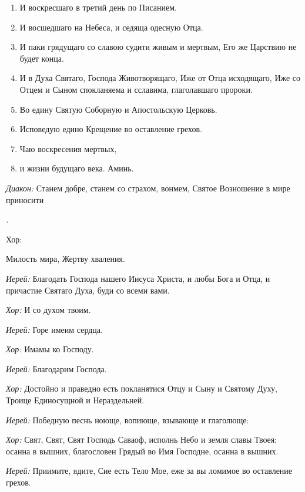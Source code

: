 \begin{mymulticols}
\begin{enumerate}
\item И воскресшаго в третий день по Писанием.


\item И восшедшаго на Небеса, и седяща одесную Отца.


\item И паки грядущаго со славою судити живым и мертвым, Его же Царствию не будет конца.


\item И в Духа Святаго, Господа Животворящаго, Иже от Отца исходящаго, Иже со Отцем и Сыном спокланяема и сславима, глаголавшаго пророки.


\item Во едину Святую Соборную и Апостольскую Церковь.


\item Исповедую едино Крещение во оставление грехов.


\item Чаю воскресения мертвых,


\item и жизни будущаго века. Аминь. 

\end{enumerate}




 {\itshape Диакон:} Станем добре, станем со страхом, вонмем, Святое Возношение в мире приносити{\itshape . 


  Хор:} Милость мира, Жертву хваления. 

{\itshape Иерей:} Благодать Господа нашего Иисуса Христа, и любы Бога и Отца, и причастие Святаго Духа, буди со всеми вами.


{\itshape Хор:} И со духом твоим. 

{\itshape Иерей:} Горе имеим сердца. 

{\itshape Хор:} Имамы ко Господу. 

{\itshape Иерей:} Благодарим Господа. 

{\itshape Хор:} Достойно и праведно есть покланятися Отцу и Сыну и Святому Духу, Троице Единосущной и Нераздельней.
  
  {\itshape Иерей:} Победную песнь ноюще, вопиюще, взывающе и глаголюще:
  
  {\itshape Хор:} Свят, Свят, Свят Господь Саваоф, исполнь Небо и земля славы Твоея; осанна в вышних, благословен Грядый во Имя Господне, осанна в вышних.
  
  {\itshape Иерей:} Приимите, ядите, Сие есть Тело Мое, еже за вы ломимое во оставление грехов.
  

\end{mymulticols}
